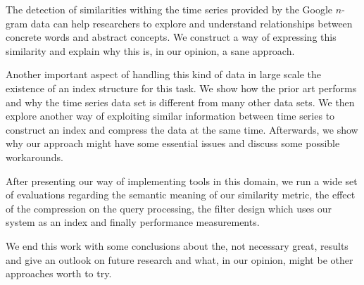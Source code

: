 \Abstract{}

The detection of similarities withing the time series provided by the Google $n$-gram data can help researchers to explore and understand relationships between concrete words and abstract concepts. We construct a way of expressing this similarity and explain why this is, in our opinion, a sane approach.

Another important aspect of handling this kind of data in large scale the existence of an index structure for this task. We show how the prior art performs and why the time series data set is different from many other data sets. We then explore another way of exploiting similar information between time series to construct an index and compress the data at the same time. Afterwards, we show why our approach might have some essential issues and discuss some possible workarounds.

After presenting our way of implementing tools in this domain, we run a wide set of evaluations regarding the semantic meaning of our similarity metric, the effect of the compression on the query processing, the filter design which uses our system as an index and finally performance measurements.

We end this work with some conclusions about the, not necessary great, results and give an outlook on future research and what, in our opinion, might be other approaches worth to try.
